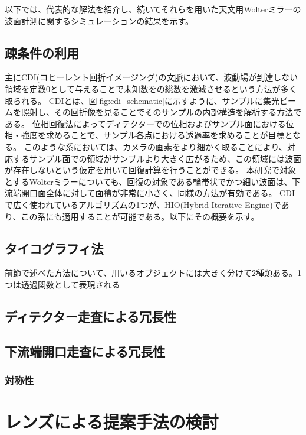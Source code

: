 \documentclass[dvipdfmx,autodetect-engine]{jreport}
\begin{document}
以下では、代表的な解法を紹介し、続いてそれらを用いた天文用Wolterミラーの波面計測に関するシミュレーションの結果を示す。

\section{疎条件の利用}
主にCDI(コヒーレント回折イメージング)の文脈において、波動場が到達しない領域を定数0として与えることで未知数をの総数を激減させるという方法が多く取られる。
CDIとは、図\ref{fig:cdi_schematic}に示すように、サンプルに集光ビームを照射し、その回折像を見ることでそのサンプルの内部構造を解析する方法である。
位相回復法によってディテクターでの位相およびサンプル面における位相・強度を求めることで、サンプル各点における透過率を求めることが目標となる。
このような系においては、カメラの画素をより細かく取ることにより、対応するサンプル面での領域がサンプルより大きく広がるため、この領域には波面が存在しないという仮定を用いて回復計算を行うことができる。
本研究で対象とするWolterミラーについても、回復の対象である輪帯状でかつ細い波面は、下流端開口面全体に対して面積が非常に小さく、同様の方法が有効である。
CDIで広く使われているアルゴリズムの1つが、HIO(Hybrid Iterative Engine)であり、この系にも適用することが可能である。以下にその概要を示す。

\section{タイコグラフィ法}
前節で述べた方法について、用いるオブジェクトには大きく分けて2種類ある。1つは透過関数として表現される


\section{ディテクター走査による冗長性}

\section{下流端開口走査による冗長性}

\subsection{対称性}

\newpage
\chapter{レンズによる提案手法の検討}
\minitoc
\end{document}
